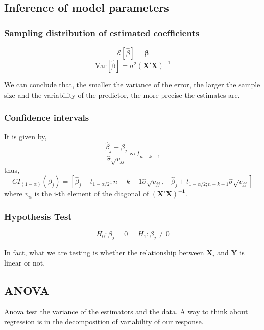 \subsection{Inference of model parameters}
\subsubsection{Sampling distribution of estimated coefficients}
\begin{equation}
    \mathcal{E}[\hat{\beta}] = \bm{\beta}
\end{equation}
\begin{equation}
    \text{Var}[\hat{\beta}] = \sigma^2 (\bm{X'X})^{-1}
\end{equation}

We can conclude that, the smaller the variance of the error, the larger the
sample size and the variability of the predictor, the more precise the estimates
are.

\subsubsection{Confidence intervals}
It is given by,
\begin{equation}
    \frac{\hat{\beta}_{j}-\beta_{j}}{\hat{\sigma} \sqrt{v_{j j}}} \sim t_{n-k-1}
\end{equation}
thus,
\begin{equation}
    CI_{(1-\alpha)}\left(\beta_{j}\right)=\left[\hat{\beta}_{j}-t_{1-\alpha / 2} ; n-k-1 \hat{\sigma} \sqrt{v_{j j}},\;\;\;
     \hat{\beta}_{j}+t_{1-\alpha / 2 ; n-k-1} \hat{\sigma} \sqrt{v_{j j}}\right]
\end{equation}
where $v_{ii}$ is the i-th element of the diagonal of $\bm{(X'X)^{-1}}$.

\subsubsection{Hypothesis Test}
\begin{equation}
    H_0: \beta_j = 0 \;\;\;\;\; H_1: \beta_j \neq 0
\end{equation}

In fact, what we are testing is whether the relationship between $\bm{X}_i$ and
$\bm{Y}$ is linear or not.

\subsection{ANOVA}
Anova test the variance of the estimators and the data. A way to think about
regression is in the decomposition of variability of our response.

